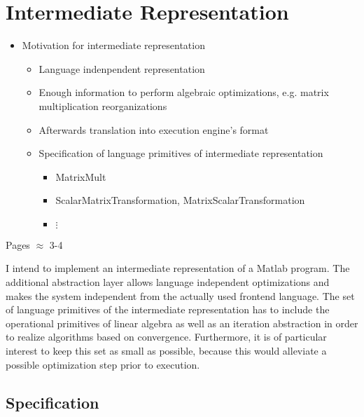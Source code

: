 \chapter{Intermediate Representation}
\label{cha:intermediaterepresentation}

\begin{itemize}
	\item Motivation for intermediate representation
	\begin{itemize}
		\item Language indenpendent representation
		\item Enough information to perform algebraic optimizations, e.g. matrix multiplication reorganizations
		\item Afterwards translation into execution engine's format
		\item Specification of language primitives of intermediate representation
		\begin{itemize}
			\item MatrixMult
			\item ScalarMatrixTransformation, MatrixScalarTransformation
			\item $\vdots$
		\end{itemize}
	\end{itemize}
\end{itemize}

Pages $\approx$ 3-4

I intend to implement an intermediate representation of a Matlab program.
The additional abstraction layer allows language independent optimizations and makes the system independent from the actually used frontend language.
The set of language primitives of the intermediate representation has to include the operational primitives of linear algebra as well as an iteration abstraction in order to realize algorithms based on convergence.
Furthermore, it is of particular interest to keep this set as small as possible, because this would alleviate a possible optimization step prior to execution.


\section{Specification}